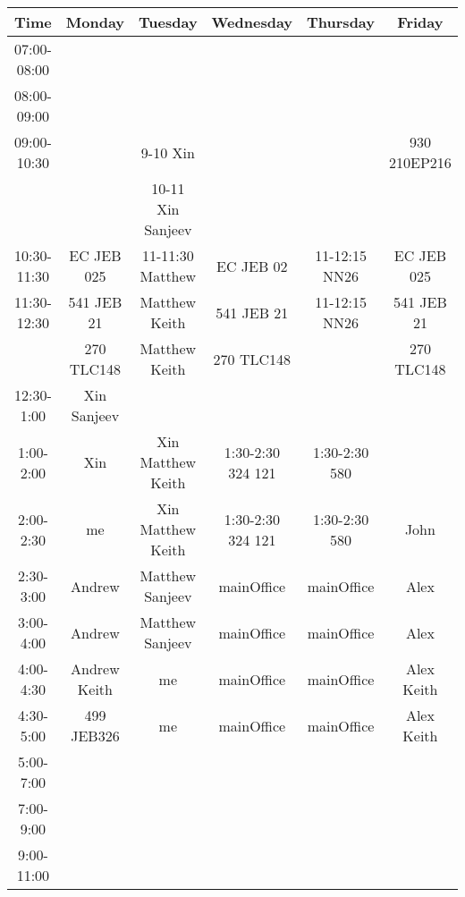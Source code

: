 \documentclass{article}  %
\begin{document}
\begin{table}[!hbp]
\begin{tabular}{|c|c|c|c|c|c|}   %
\hline %
\hline %
Time        & Monday       & Tuesday           & Wednesday  & Thursday      & Friday \\
\hline
07:00-08:00 &              &                   &            &               &  \\
\hline
08:00-09:00 &              &                   &            &               &  \\
\hline
\hline
09:00-10:30 &              & 9-10 Xin          &            &               & 930 210EP216  \\
            &              & 10-11 Xin Sanjeev &            &               &  \\
\hline
10:30-11:30 & EC JEB 025   & 11-11:30 Matthew  & EC JEB 02  & 11-12:15 NN26 & EC JEB 025 \\
\hline
11:30-12:30 & 541 JEB 21   & Matthew Keith     & 541 JEB 21 & 11-12:15 NN26 & 541 JEB 21 \\
            & 270 TLC148   & Matthew Keith     & 270 TLC148 &               & 270 TLC148 \\
\hline
12:30-1:00  & Xin Sanjeev  &                   &            &               & \\
\hline
1:00-2:00   & Xin          & Xin Matthew Keith & 1:30-2:30 324 121 & 1:30-2:30 580 & \\
\hline
2:00-2:30   & me           & Xin Matthew Keith & 1:30-2:30 324 121 & 1:30-2:30 580 & John   \\
2:30-3:00   & Andrew       & Matthew Sanjeev   & mainOffice & mainOffice    & Alex   \\
\hline
3:00-4:00   & Andrew       & Matthew Sanjeev   & mainOffice & mainOffice    & Alex   \\
\hline
4:00-4:30   & Andrew Keith & me                & mainOffice & mainOffice    & Alex Keith\\
4:30-5:00   & 499 JEB326   & me                & mainOffice & mainOffice    & Alex Keith\\
\hline
\hline
5:00-7:00   &  &  &  &  & \\
\hline
\hline
7:00-9:00   &  &  &  &  & \\
\hline
9:00-11:00  &  &  &  &  & \\
\hline
\hline

\end{tabular}
\end{table}
\end{document}

